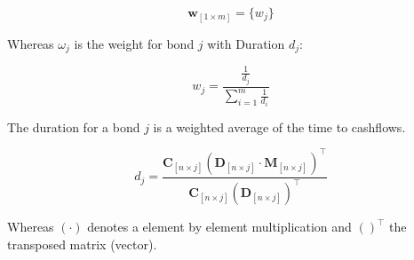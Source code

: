 \begin{equation}\label{weights}
    \bm{w}_{\left[1\times m\right]}= \{w_j\}
\end{equation}

Whereas $\omega_j$ is the weight for bond $j$ with Duration $d_j$:

\begin{displaymath}
    w_j=\frac{\frac{1}{d_j}}{\sum_{i=1}^m\frac{1}{d_i}}
\end{displaymath}


The duration for a bond $j$ is a weighted average of the time to cashflows.

\begin{equation}\label{duration}
d_j= \frac{\bm{C}_{\left[n \times j\right]} \left(\bm{D}_{\left[n\times j\right]} \cdot \bm{M}_{\left[n\times j\right]}\right)^{\top}} {\bm{C}_{\left[n \times j\right]}\left(\bm{D}_{\left[n\times j\right]}\right)^{\top}}
\end{equation}

Whereas $(\cdot)$ denotes a element by element multiplication and $( )^{\top}$ the transposed matrix (vector).


